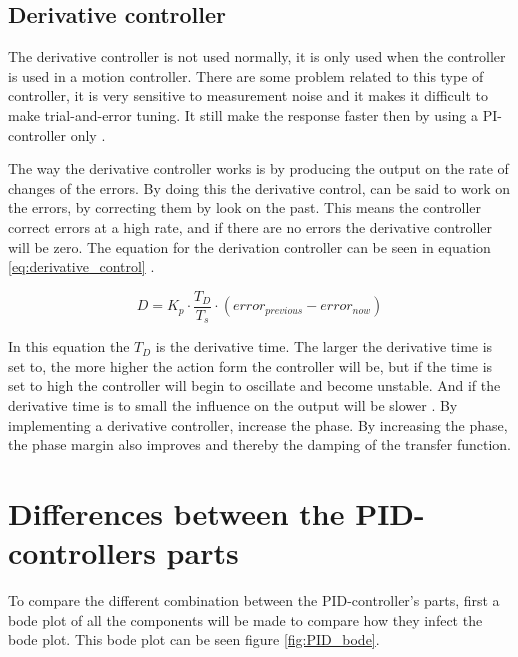 \subsection*{Derivative controller}
The derivative controller is not used normally, it is only used when the controller is used in a motion controller. There are some problem related to this type of controller, it is very sensitive to measurement noise and it makes it difficult to make trial-and-error tuning.  It still make the response faster then by using a PI-controller only \cite{PID_book}. 

The way the derivative controller works is by producing the output on the rate of changes of the errors. By doing this the derivative control, can be said to work on the errors, by correcting them by look on the past. This means the controller correct errors at a high rate, and if there are no errors the derivative controller will be zero. The equation for the derivation controller can be seen in equation \ref{eq:derivative_control} \cite{PID_book}.

\begin{equation}\label{eq:derivative_control}
D = K_p \cdot \frac{T_D}{T_s} \cdot (error_{previous} - error_{now})
\end{equation}

In this equation the $T_D$ is the derivative time. The larger the derivative time is set to, the more higher the action form the controller will be, but if the time is set to high the controller will begin to oscillate and become unstable. And if the derivative time is to small the influence on the output will be slower \cite{PID_book}. By implementing a derivative controller, increase the phase. By increasing the phase, the phase margin also improves and thereby the damping of the transfer function.

\section{Differences between the PID-controllers parts}\label{s:different_pid}
To compare the different combination between the PID-controller's parts, first a bode plot of all the components will be made to compare how they infect the bode plot. This bode plot can be seen figure \ref{fig:PID_bode}.


